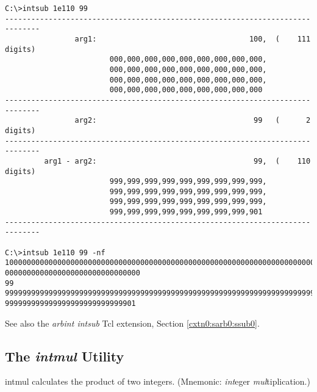 \begin{dosutilcommandsampleinvocations}
\begin{scriptsize}
\begin{verbatim}
C:\>intsub 1e110 99
------------------------------------------------------------------------------
                arg1:                                   100,  (    111 digits)
                        000,000,000,000,000,000,000,000,000,
                        000,000,000,000,000,000,000,000,000,
                        000,000,000,000,000,000,000,000,000,
                        000,000,000,000,000,000,000,000,000
------------------------------------------------------------------------------
                arg2:                                    99   (      2 digits)
------------------------------------------------------------------------------
         arg1 - arg2:                                    99,  (    110 digits)
                        999,999,999,999,999,999,999,999,999,
                        999,999,999,999,999,999,999,999,999,
                        999,999,999,999,999,999,999,999,999,
                        999,999,999,999,999,999,999,999,901
------------------------------------------------------------------------------

C:\>intsub 1e110 99 -nf
10000000000000000000000000000000000000000000000000000000000000000000000000000000
0000000000000000000000000000000
99
99999999999999999999999999999999999999999999999999999999999999999999999999999999
999999999999999999999999999901
\end{verbatim}
\end{scriptsize}
\end{dosutilcommandsampleinvocations}

\begin{dosutilcommandseealso}
See also the \emph{arbint intsub} Tcl extension, 
Section \cxtnzeroxrefhyphen{}\ref{cxtn0:sarb0:ssub0}.
\end{dosutilcommandseealso}


\subsection{The \emph{intmul} Utility}
\label{cdcm0:sali0:smul0}

\begin{dosutilcommandname}{intmul}%
calculates the product of
two integers.  (Mnemonic:  \emph{int}eger
\emph{mul}tiplication.)
\end{dosutilcommandname}

